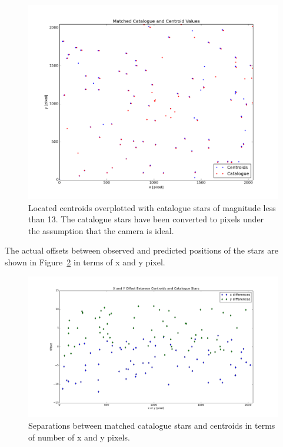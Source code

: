 \documentclass[a4paper,12pt]{article}
\begin{document}
\begin{figure}[!htbp]
\centering
\includegraphics[scale=0.35]{first_match_galaxy.png}
\caption{Located centroids overplotted with catalogue stars of magnitude less than 13. The catalogue stars have been converted to pixels under the assumption that the camera is ideal.}
\label{fig:catalogue}
\end{figure}

The actual offsets between observed and predicted positions of the stars are shown in Figure~\ref{fig:separation} in terms of x and y pixel.

\begin{figure}[!htbp]
\centering
\includegraphics[scale=0.35]{separations.png}
\caption{Separations between matched catalogue stars and centroids in terms of number of x and y pixels.}
\label{fig:separation}
\end{figure}
\end{document}
